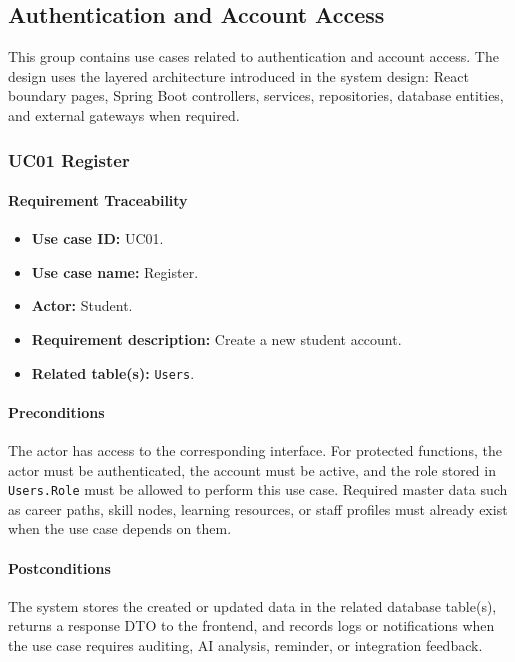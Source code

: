 \normalsize
\setlength{\tabcolsep}{6pt}

\subsection{Authentication and Account Access}

This group contains use cases related to authentication and account access. The design uses the layered architecture introduced in the system design: React boundary pages, Spring Boot controllers, services, repositories, database entities, and external gateways when required.

\subsubsection{UC01 Register}

\paragraph{Requirement Traceability}

\begin{itemize}
    \item \textbf{Use case ID:} UC01.
    \item \textbf{Use case name:} Register.
    \item \textbf{Actor:} Student.
    \item \textbf{Requirement description:} Create a new student account.
    \item \textbf{Related table(s):} \texttt{Users}.
\end{itemize}

\paragraph{Preconditions}

The actor has access to the corresponding interface. For protected functions, the actor must be authenticated, the account must be active, and the role stored in \texttt{Users.Role} must be allowed to perform this use case. Required master data such as career paths, skill nodes, learning resources, or staff profiles must already exist when the use case depends on them.

\paragraph{Postconditions}

The system stores the created or updated data in the related database table(s), returns a response DTO to the frontend, and records logs or notifications when the use case requires auditing, AI analysis, reminder, or integration feedback.

